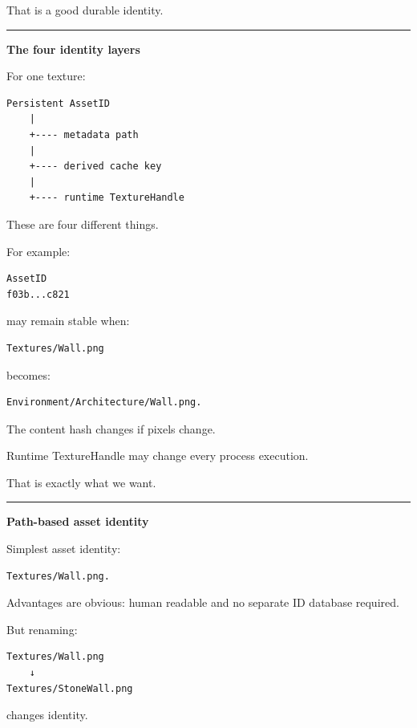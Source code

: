 That is a good durable identity.

\begin{center}\rule{0.5\linewidth}{0.5pt}\end{center}

\textbf{The four identity layers}

For one texture:

\begin{verbatim}
Persistent AssetID
    |
    +---- metadata path
    |
    +---- derived cache key
    |
    +---- runtime TextureHandle
\end{verbatim}

These are four different things.

For example:

\begin{verbatim}
AssetID
f03b...c821
\end{verbatim}

may remain stable when:

\begin{verbatim}
Textures/Wall.png
\end{verbatim}

becomes:

\begin{verbatim}
Environment/Architecture/Wall.png.
\end{verbatim}

The content hash changes if pixels change.

Runtime TextureHandle may change every process execution.

That is exactly what we want.

\begin{center}\rule{0.5\linewidth}{0.5pt}\end{center}

\textbf{Path-based asset identity}

Simplest asset identity:

\begin{verbatim}
Textures/Wall.png.
\end{verbatim}

Advantages are obvious: human readable and no separate ID database required.

But renaming:

\begin{verbatim}
Textures/Wall.png
    ↓
Textures/StoneWall.png
\end{verbatim}

changes identity.

